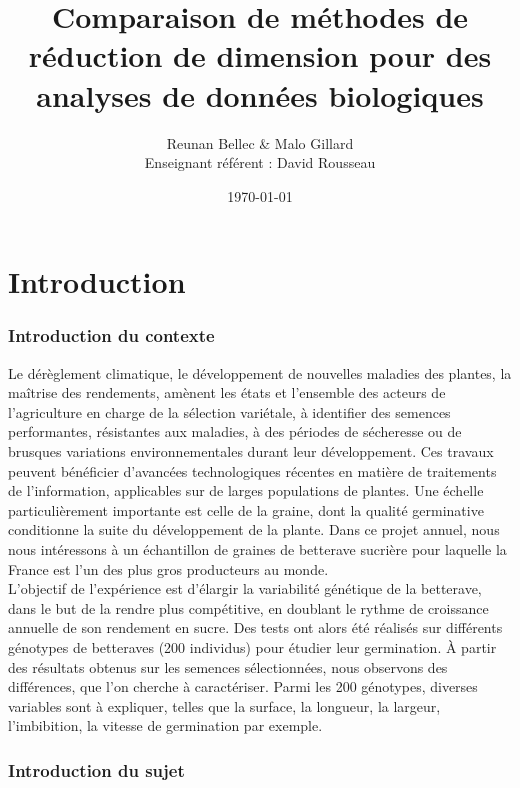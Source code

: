 \documentclass[12pt]{article}
\title{\textbf{Comparaison de méthodes de réduction de dimension pour des analyses de données biologiques}}
\author{Reunan Bellec \& Malo Gillard \\ Enseignant référent : David Rousseau}
\date{\today} %
\begin{document}
\maketitle

\newpage

\tableofcontents

\newpage
\part{Introduction}

\section*{Introduction du contexte}

Le dérèglement climatique, le développement de nouvelles maladies des plantes, la maîtrise des rendements, amènent les états et l’ensemble des acteurs de l’agriculture en charge de la sélection variétale, à identifier des semences performantes, résistantes aux maladies, à des périodes de sécheresse ou de brusques variations environnementales durant leur développement. Ces travaux peuvent bénéficier d’avancées technologiques récentes en matière de traitements de l’information, applicables sur de larges populations de plantes. Une échelle particulièrement importante est celle de la graine, dont la qualité germinative conditionne la suite du développement de la plante. Dans ce projet annuel, nous nous intéressons à un échantillon de graines de betterave sucrière pour laquelle la France est l’un des plus gros producteurs au monde.\\

L'objectif de l'expérience est d'élargir la variabilité génétique de la betterave, dans le but de la rendre plus compétitive, en doublant le rythme de croissance annuelle de son rendement en sucre.
Des tests ont alors été réalisés sur différents génotypes de betteraves (200 individus) pour étudier leur germination.
À partir des résultats obtenus sur les semences sélectionnées, nous observons des différences, que l'on cherche à caractériser. Parmi les 200 génotypes, diverses variables sont à expliquer, telles que la surface, la longueur, la largeur, l'imbibition, la vitesse de germination par exemple.\\

\section*{Introduction du sujet}
\end{document}
